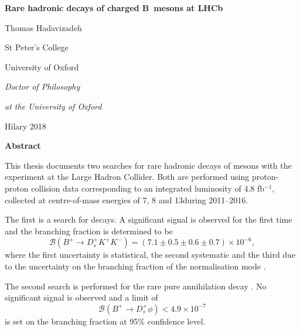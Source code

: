 

\begin{alwayssingle} 
 \thispagestyle{empty}
 \vspace*{-1in}
 \begin{center}
   { \Large {\bfseries {Rare hadronic decays of charged B~mesons at LHCb}} \par}
   {{\large \vspace*{1ex} Thomas Hadavizadeh} \par}
   {\large \vspace*{1ex}
   {{St Peter's College} \par}
   {University of Oxford \par}
   \vspace*{1ex}
   {{\it \submittedtext} \par}
   {\it {Doctor of Philosophy} \par}
   {\it {at the University of Oxford} \par}
    \vspace*{2ex}
    {Hilary 2018}\par}
    \vspace*{1.5cm}
    {\Large \bfseries  Abstract}
  \end{center}

  This thesis documents two searches for rare hadronic decays of \Bp mesons with the \lhcb experiment at the Large Hadron Collider. 
  Both are performed using proton-proton collision data corresponding to an integrated luminosity of 4.8 fb$^{-1}$, collected at centre-of-mass energies of 7, 8 and 13\tev during 2011--2016.
  
  The first is a search for \decay{\Bp}{\Dsp\Kp\Km} decays. A significant signal is observed for the first time and the branching fraction is determined to be
  \begin{equation*}
  \mathcal{B}(B^{+} \to D_s^{+}K^{+}K^{-} ) = (7.1 \pm 0.5 \pm 0.6 \pm 0.7) \times 10^{-6}, 
  \end{equation*}
  \noindent where the first uncertainty is statistical, the second systematic and the third due to the uncertainty on 
  the branching fraction of the normalisation mode \decay{\Bp}{\Dsp\Dzb}.
  
  The second search is performed for the rare pure annihilation decay \decay{\Bp}{\Dsp\phiz}.
  No significant signal is observed and a limit of
  \begin{equation*}
  \mathcal{B}(B^{+} \to D_s^{+}\phi) < 4.9 \times 10^{-7}
  \end{equation*}
  is set on the branching fraction at 95\% confidence level.



\end{alwayssingle}